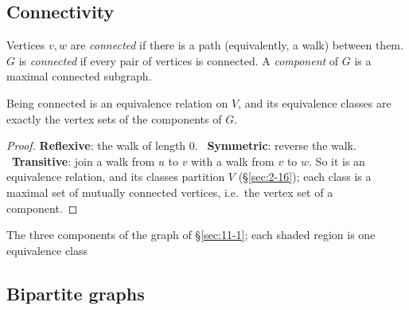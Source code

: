 \subsection{Connectivity}
\label{sec:11-9}

\begin{definition}
Vertices $v,w$ are \emph{connected} if there is a path (equivalently, a walk) between them. $G$ is \emph{connected} if every pair of vertices is connected. A \emph{component} of $G$ is a maximal connected subgraph.
\end{definition}

\begin{proposition}
Being connected is an equivalence relation on $V$, and its equivalence classes are exactly the vertex sets of the components of $G$.
\end{proposition}
\begin{proof}
\textbf{Reflexive}: the walk of length $0$. \ \textbf{Symmetric}: reverse the walk. \ \textbf{Transitive}: join a walk from $u$ to $v$ with a walk from $v$ to $w$. So it is an equivalence relation, and its classes partition $V$ (\S\ref{sec:2-16}); each class is a maximal set of mutually connected vertices, i.e.\ the vertex set of a component.
\end{proof}

\begin{center}
\end{center}
\begin{center}
\small The three components of the graph of \S\ref{sec:11-1}; each shaded region is one equivalence class
\end{center}

\subsection{Bipartite graphs}
\label{sec:11-10}

